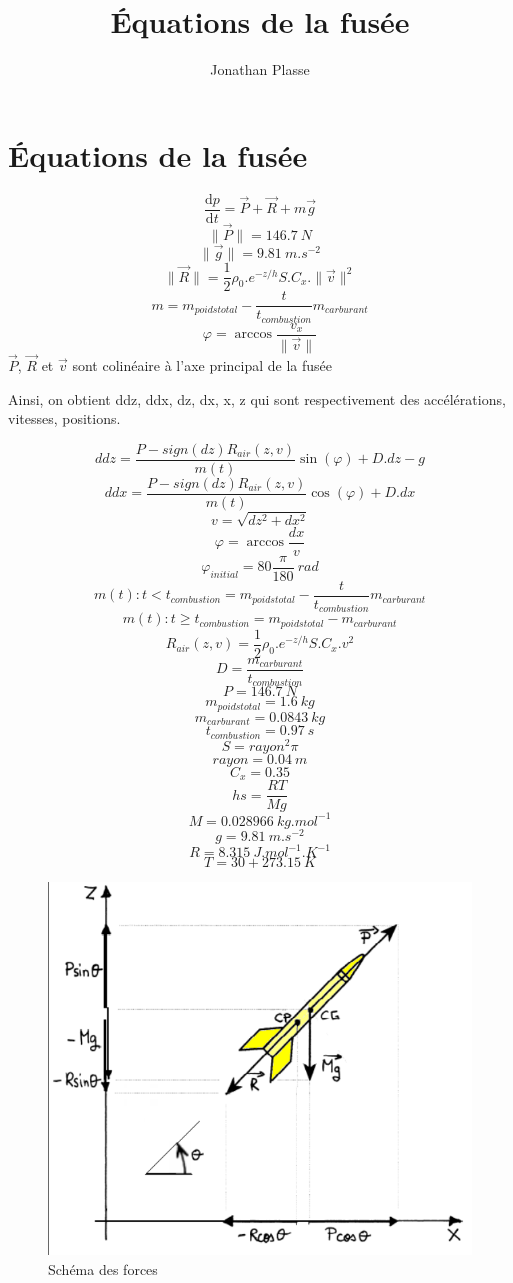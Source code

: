 \documentclass[10pt,a4paper]{article}
\title{Équations de la fusée}
\author{Jonathan Plasse}
\begin{document}
	\section*{Équations de la fusée}
	\[\dfrac{\mathrm{d}p}{\mathrm{d}t}=\vec{P}+\vec{R}+m\vec{g}\]
	\[\|\vec{P}\|=146.7\ N\]
	\[\|\vec{g}\|=9.81\ m.s^{-2}\]
	\[\|\vec{R}\|=\frac{1}{2}\rho_0.e^{-z/h}S.C_x.\|\vec{v}\|^2\]
	\[m=m_{poidstotal}-\frac{t}{t_{combustion}}m_{carburant}\]
	\[\varphi=\arccos\frac{v_x}{\|\vec{v}\|}\]
	$\vec{P}$, $\vec{R}$ et $\vec{v}$ sont colinéaire à l'axe principal de la fusée

	Ainsi, on obtient ddz, ddx, dz, dx, x, z qui sont respectivement des accélérations, vitesses, positions.
	
	
	\[ddz = \frac{P-sign(dz)R_{air}(z, v)}{m(t)}\sin(\varphi)+D.dz-g\]
	\[ddx = \frac{P-sign(dz)R_{air}(z, v)}{m(t)}\cos(\varphi)+D.dx\]
	\[v=\sqrt{dz^2+dx^2}\]
	\[\varphi=\arccos\frac{dx}{v}\]
	\[\varphi_{initial}=80\frac{\pi}{180}\ rad\]
	\[m(t):t<t_{combustion}=m_{poidstotal}-\frac{t}{t_{combustion}}m_{carburant}\]
	\[m(t):t\ge t_{combustion}=m_{poidstotal}-m_{carburant}\]
	\[R_{air}(z,v)=\frac{1}{2}\rho_0.e^{-z/h}S.C_x.v^2\]
	\[D=\frac{m_{carburant}}{t_{combustion}}\]
	\[P=146.7\ N\]
	\[m_{poidstotal} = 1.6\ kg\]
	\[m_{carburant} = 0.0843\ kg\]
	\[t_{combustion} = 0.97\ s\]
	\[S = rayon^2\pi\]
	\[rayon = 0.04\ m\]
	\[C_x = 0.35\]
	\[hs = \frac{RT}{Mg}\]
	\[M = 0.028966\ kg.mol^{-1}\]
	\[g = 9.81\ m.s^{-2}\]
	\[R = 8.315\ J.mol^{-1}.K^{-1}\]
	\[T = 30+273.15\ K\]
	
	\begin{figure}[h]
		\centering
		\includegraphics[scale=0.5]{fusee.png}
		\caption{Schéma des forces}
	\end{figure}
\end{document}
